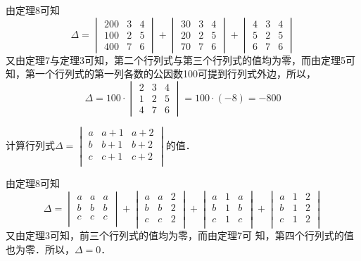 \begin{solution}
由定理8可知
\[\Delta=\begin{vmatrix}
    200&3&4\\
    100&2&5\\
    400&7&6
\end{vmatrix}+\begin{vmatrix}
    30&3&4\\
    20&2&5\\
    70&7&6
\end{vmatrix}+\begin{vmatrix}
    4&3&4\\
    5&2&5\\
    6&7&6
\end{vmatrix}\]
又由定理7与定理3可知，第二个行列式与第三个行列式的值均为零，而由定理5可知，第一个行列式的第一列各数的公因数100可提到行列式外边，所以，
\[\Delta=100\cdot \begin{vmatrix}
    2&3&4\\
    1&2&5\\
    4&7&6
\end{vmatrix}=100\cdot (-8)=-800\]
\end{solution}

\begin{example}
计算行列式$\Delta=\begin{vmatrix}
        a&a+1&a+2\\
        b&b+1&b+2\\
        c&c+1&c+2\\
    \end{vmatrix}$的值．
\end{example}



\begin{solution}
由定理8可知
\[\Delta=\begin{vmatrix}
    a&a&a\\
    b&b&b\\
    c&c&c\\
\end{vmatrix}+\begin{vmatrix}
    a&a&2\\
    b&b&2\\
    c&c&2\\
\end{vmatrix}+\begin{vmatrix}
    a&1&a\\
    b&1&b\\
    c&1&c\\
\end{vmatrix}+\begin{vmatrix}
    a&1&2\\
    b&1&2\\
    c&1&2\\
\end{vmatrix}\]   
又由定理3可知，前三个行列式的值均为零，而由定理7可
知，第四个行列式的值也为零．所以，$\Delta=0$．  
\end{solution}

